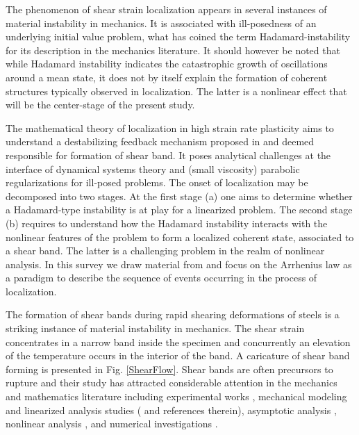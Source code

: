 \documentclass[a4paper,11pt]{article}
\theoremstyle{remark}
\begin{document}
The phenomenon of shear strain localization appears in several instances of material instability in mechanics. It is associated with ill-posedness of an underlying initial value problem,
what has coined the term  Hadamard-instability for its description in the mechanics literature.
It should however be noted that
while Hadamard instability indicates the catastrophic growth of oscillations around a mean state,
it does not by itself explain the formation of coherent structures typically observed in localization.
The latter is a nonlinear effect that will be the center-stage of the present study.

The mathematical theory of localization in high strain rate plasticity aims to understand
a destabilizing feedback mechanism proposed in  \cite{ZH,CDHS} and
deemed responsible for formation of shear band.
It poses analytical challenges at the interface of dynamical systems theory
and (small viscosity) parabolic regularizations for ill-posed problems.
The onset of localization may be decomposed into two stages.
At the first stage (a) one aims to determine whether a Hadamard-type instability is
at play for a linearized problem. The second stage (b)  requires  to understand how the Hadamard instability
interacts with the nonlinear features of the problem to form a localized coherent state,
associated to a shear band.
The latter is a challenging problem in the realm of nonlinear analysis.
In this survey we draw material from \cite{KT,KT2,BKT} and focus on the Arrhenius law as a
paradigm to describe the sequence of events occurring in the process of localization.



The formation of shear bands during rapid
shearing deformations of steels \cite{CCHD,HDH,ZH}  is a striking instance of material instability in mechanics.
The shear strain concentrates in a narrow band inside the specimen and
concurrently an elevation of the temperature occurs in the interior of the band.
A caricature of shear band forming is presented in Fig. \ref{ShearFlow}.
Shear bands are often precursors to rupture and their study has attracted considerable
attention in the mechanics and mathematics literature including
experimental works  \cite{CCHD,HDH}, mechanical modeling
and  linearized analysis studies  (\cite{CDHS,FM,MC,WW,Wr} and references therein),
asymptotic analysis \cite{DO, WrOc},
nonlinear analysis  \cite{DH,Tzavaras87,Tzavaras91,BPV},
and numerical  investigations \cite{Wa,ELW,BKT}.
\end{document}
